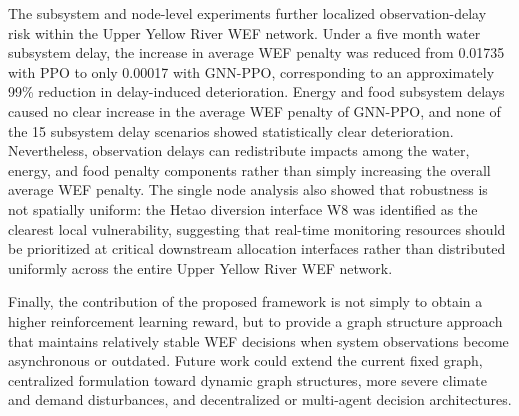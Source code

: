 \documentclass [a4paper,fleqn] {cas-dc}
\begin{document}
The subsystem and node-level experiments further localized observation-delay risk within the Upper Yellow River WEF network. Under a five month water subsystem delay, the increase in average WEF penalty was reduced from 0.01735 with PPO to only 0.00017 with GNN-PPO, corresponding to an approximately 99\% reduction in delay-induced deterioration. Energy and food subsystem delays caused no clear increase in the average WEF penalty of GNN-PPO, and none of the 15 subsystem delay scenarios showed statistically clear deterioration. Nevertheless, observation delays can redistribute impacts among the water, energy, and food penalty components rather than simply increasing the overall average WEF penalty. The single node analysis also showed that robustness is not spatially uniform: the Hetao diversion interface W8 was identified as the clearest local vulnerability, suggesting that real-time monitoring resources should be prioritized at critical downstream allocation interfaces rather than distributed uniformly across the entire Upper Yellow River WEF network.

Finally, the contribution of the proposed framework is not simply to obtain a higher reinforcement learning reward, but to provide a graph structure approach that maintains relatively stable WEF decisions when system observations become asynchronous or outdated. Future work could extend the current fixed graph, centralized formulation toward dynamic graph structures, more severe climate and demand disturbances, and decentralized or multi-agent decision architectures.


\appendix
\setcounter{table}{0}
\renewcommand{\thetable}{S\arabic{table}}
\end{document}
